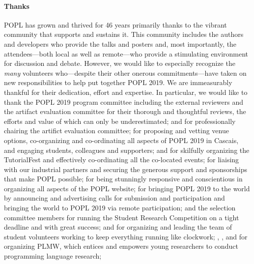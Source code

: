 \paragraph{Thanks}
%
POPL has grown and thrived for 46 years primarily thanks to
the vibrant community that supports and sustains it.
%
This community includes the authors and developers who
provide the talks and posters and, most importantly, the attendees---both local
as well as remote---who provide a stimulating environment
for discussion and debate.
%
However, we would like to especially recognize the \emph{many}
volunteers who---despite their other onerous commitments---have
taken on new responsibilities to help put together POPL 2019.
%
We are immeasurably thankful for their dedication, effort and expertise.
%
In particular, we would like to thank
%
the POPL 2019 program committee including the external reviewers and 
the artifact evaluation committee for their
thorough and thoughtful reviews, the efforts and value of which can only be underestimated;
%
 and  for professionally chairing the artifict evaluation committee;
 for proposing and vetting venue options, co-organizing and co-ordinating all aspects of POPL 2019 in Cascais, and engaging students, colleagues and supporters;
%
 and  for skilfully organizing
the TutorialFest and effectively co-ordinating all the co-located events;
%
 for liaising with our industrial
partners and securing the generous support and sponsorships that make POPL possible;
%
 for being stunningly responsive 
and conscientious in organizing all aspects of the POPL website;
%
 for bringing POPL 2019 to the world by announcing and advertising calls for
submission and participation and bringing the world to POPL 2019 via remote participation; 
%
 and the selection committee members for running the Student Research Competition on a tight deadline and with great success;
%
 and  for organizing
and leading the team of student volunteers working to keep everything running like clockwork;
%
%
, ,
 and 
for organizing PLMW, which entices and empowers young researchers to conduct programming language research;
